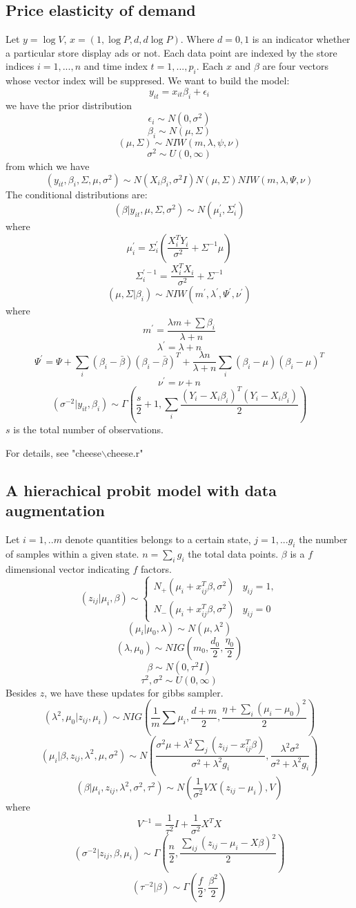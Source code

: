\documentclass{article}
\begin{document}
\subsection{Price elasticity of demand}
Let $y=\log V$, $x=(1,\log P,d,d\log P)$. Where $d=0,1$ is an indicator whether a particular store display ads or not.  Each data point are indexed by the store indices $i=1,...,n$ and time index $t=1,...,p_i$. Each $x$ and $\beta$ are four vectors whose vector index will be suppresed. We want to build the model:
\[
y_{it}=x_{it}\beta_i+\epsilon_i
\]
we have the prior distribution
\[
\epsilon_i\sim N(0,\sigma^2)
\]
\[
\beta_i\sim N(\mu,\Sigma)
\]
\[
(\mu,\Sigma)\sim NIW(m,\lambda,\psi,\nu)
\]
\[
\sigma^2\sim U(0,\infty)
\]
from which we have
\[
(y_{it},\beta_i,\Sigma,\mu,\sigma^2)\sim N(X_i\beta_i,\sigma^2I)N(\mu,\Sigma)NIW(m,\lambda,\Psi,\nu)
\]
The conditional distributions are:
\[
(\beta|y_{it},\mu,\Sigma,\sigma^2)\sim N(\mu_i^\prime,\Sigma_i^\prime)
\]
where 
\[
\mu_i^\prime=\Sigma_i^\prime(\frac {X_i^TY_i}{\sigma^2}+\Sigma^{-1}\mu)
\]
\[
\Sigma_i^{\prime-1}=\frac{X_i^TX_i}{\sigma^2}+\Sigma^{-1}
\]
\[
(\mu,\Sigma|\beta_i)\sim NIW(m^\prime,\lambda^\prime,\Psi^\prime,\nu^\prime)
\]
where
\[
m^\prime=\frac{\lambda m+\sum\beta_i}{\lambda+n}
\]
\[
\lambda^\prime=\lambda+n
\]
\[
\Psi^\prime=\Psi+\sum_i(\beta_i-\bar{\beta})(\beta_i-\bar{\beta})^T+\frac{\lambda n}{\lambda+n}\sum_i(\beta_i-\mu)(\beta_i-\mu)^T
\]
\[
\nu^\prime=\nu+n
\]
\[
(\sigma^{-2}|y_{it},\beta_i)\sim \Gamma(\frac{s}{2}+1,\sum_i\frac{(Y_i-X_i\beta_i)^T(Y_i-X_i\beta_i)}{2})
\]
$s$ is the total number of observations.

For details, see "cheese$\backslash$cheese.r"
\subsection{A hierachical probit model with data augmentation}
Let $i=1,..m$ denote quantities belongs to a certain state, $j=1,...g_i$ the number of samples within a given state. $n=\sum_ig_i$ the total data points. $\beta$ is a $f$ dimensional vector indicating $f$ factors.
\[
(z_{ij}|\mu_i,\beta)\sim\left\{\begin{array}{rl}
N_+(\mu_i+x_{ij}^T\beta,\sigma^2)& y_{ij}=1,\\
N_-(\mu_i+x_{ij}^T\beta,\sigma^2)& y_{ij}=0
\end{array}\right.
\]
\[
(\mu_i|\mu_0,\lambda)\sim N(\mu,\lambda^2)
\]
\[
(\lambda,\mu_0)\sim NIG(m_0,\frac{d_0}{2},\frac{\eta_0}{2})
\]
\[
\beta\sim N(0,\tau^2I)
\]
\[
\tau^2,\sigma^2\sim U(0,\infty)
\]
Besides $z$, we have these updates for gibbs sampler.
\[
(\lambda^2,\mu_0|z_{ij},\mu_i)\sim NIG(\frac{1}{m}\sum\mu_i,\frac{d+m}{2},\frac{\eta+\sum_i(\mu_i-\mu_0)^2}{2})
\]
\[
(\mu_i|\beta,z_{ij},\lambda^2,\mu,\sigma^2)\sim N(\frac{\sigma^2\mu+\lambda^2\sum_j(z_{ij}-x_{ij}^T\beta)}{\sigma^2+\lambda^2g_i},\frac{\lambda^2\sigma^2}{\sigma^2+\lambda^2g_i})
\]
\[
(\beta|\mu_i,z_{ij},\lambda^2,\sigma^2,\tau^2)\sim N(\frac{1}{\sigma^2}VX(z_{ij}-\mu_i),V)
\]
where
\[
V^{-1}=\frac{1}{\tau^2}I+\frac{1}{\sigma^2}X^TX
\]
\[
(\sigma^{-2}|z_{ij},\beta,\mu_i)\sim \Gamma(\frac{n}{2},\frac{\sum_{ij}(z_{ij}-\mu_i-X\beta)^2}{2})
\]
\[
(\tau^{-2}|\beta)\sim\Gamma(\frac{f}{2},\frac{\beta^2}{2})
\]
\end{document}
